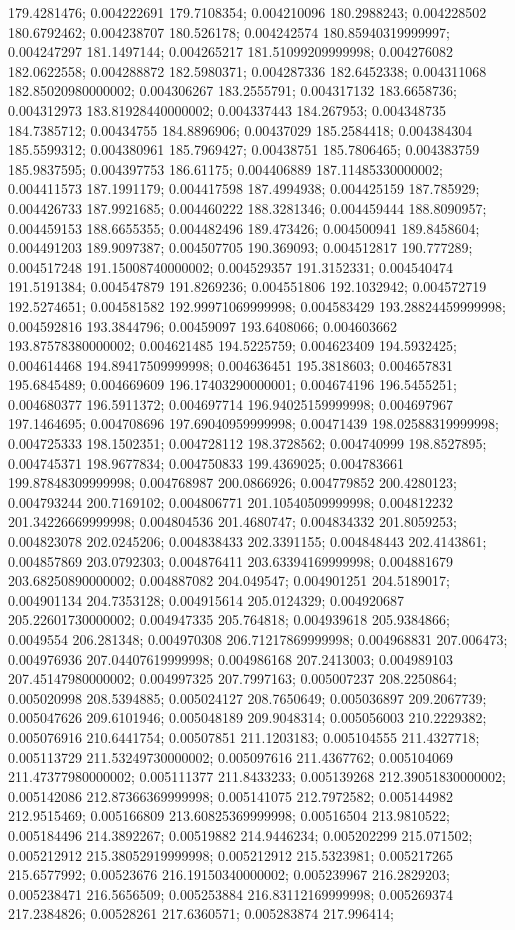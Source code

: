179.4281476; 0.004222691 179.7108354; 0.004210096 180.2988243; 0.004228502 180.6792462; 0.004238707 180.526178; 0.004242574 180.85940319999997; 0.004247297 181.1497144; 0.004265217 181.51099209999998; 0.004276082 182.0622558; 0.004288872 182.5980371; 0.004287336 182.6452338; 0.004311068 182.85020980000002; 0.004306267 183.2555791; 0.004317132 183.6658736; 0.004312973 183.81928440000002; 0.004337443 184.267953; 0.004348735 184.7385712; 0.00434755 184.8896906; 0.00437029 185.2584418; 0.004384304 185.5599312; 0.004380961 185.7969427; 0.00438751 185.7806465; 0.004383759 185.9837595; 0.004397753 186.61175; 0.004406889 187.11485330000002; 0.004411573 187.1991179; 0.004417598 187.4994938; 0.004425159 187.785929; 0.004426733 187.9921685; 0.004460222 188.3281346; 0.004459444 188.8090957; 0.004459153 188.6655355; 0.004482496 189.473426; 0.004500941 189.8458604; 0.004491203 189.9097387; 0.004507705 190.369093; 0.004512817 190.777289; 0.004517248 191.15008740000002; 0.004529357 191.3152331; 0.004540474 191.5191384; 0.004547879 191.8269236; 0.004551806 192.1032942; 0.004572719 192.5274651; 0.004581582 192.99971069999998; 0.004583429 193.28824459999998; 0.004592816 193.3844796; 0.00459097 193.6408066; 0.004603662 193.87578380000002; 0.004621485 194.5225759; 0.004623409 194.5932425; 0.004614468 194.89417509999998; 0.004636451 195.3818603; 0.004657831 195.6845489; 0.004669609 196.17403290000001; 0.004674196 196.5455251; 0.004680377 196.5911372; 0.004697714 196.94025159999998; 0.004697967 197.1464695; 0.004708696 197.69040959999998; 0.00471439 198.02588319999998; 0.004725333 198.1502351; 0.004728112 198.3728562; 0.004740999 198.8527895; 0.004745371 198.9677834; 0.004750833 199.4369025; 0.004783661 199.87848309999998; 0.004768987 200.0866926; 0.004779852 200.4280123; 0.004793244 200.7169102; 0.004806771 201.10540509999998; 0.004812232 201.34226669999998; 0.004804536 201.4680747; 0.004834332 201.8059253; 0.004823078 202.0245206; 0.004838433 202.3391155; 0.004848443 202.4143861; 0.004857869 203.0792303; 0.004876411 203.63394169999998; 0.004881679 203.68250890000002; 0.004887082 204.049547; 0.004901251 204.5189017; 0.004901134 204.7353128; 0.004915614 205.0124329; 0.004920687 205.22601730000002; 0.004947335 205.764818; 0.004939618 205.9384866; 0.0049554 206.281348; 0.004970308 206.71217869999998; 0.004968831 207.006473; 0.004976936 207.04407619999998; 0.004986168 207.2413003; 0.004989103 207.45147980000002; 0.004997325 207.7997163; 0.005007237 208.2250864; 0.005020998 208.5394885; 0.005024127 208.7650649; 0.005036897 209.2067739; 0.005047626 209.6101946; 0.005048189 209.9048314; 0.005056003 210.2229382; 0.005076916 210.6441754; 0.00507851 211.1203183; 0.005104555 211.4327718; 0.005113729 211.53249730000002; 0.005097616 211.4367762; 0.005104069 211.47377980000002; 0.005111377 211.8433233; 0.005139268 212.39051830000002; 0.005142086 212.87366369999998; 0.005141075 212.7972582; 0.005144982 212.9515469; 0.005166809 213.60825369999998; 0.00516504 213.9810522; 0.005184496 214.3892267; 0.00519882 214.9446234; 0.005202299 215.071502; 0.005212912 215.38052919999998; 0.005212912 215.5323981; 0.005217265 215.6577992; 0.00523676 216.19150340000002; 0.005239967 216.2829203; 0.005238471 216.5656509; 0.005253884 216.83112169999998; 0.005269374 217.2384826; 0.00528261 217.6360571; 0.005283874 217.996414; 
